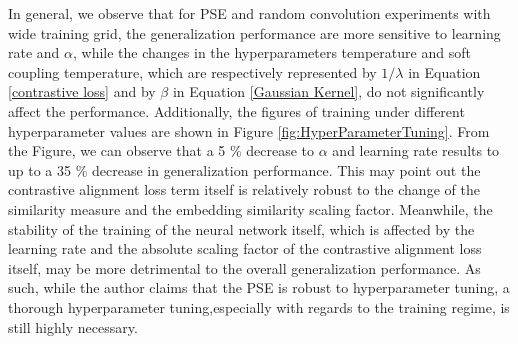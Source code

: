 \documentclass{usiinftr}
\begin{document}
In general, we observe that for PSE and random convolution experiments with wide training grid, the generalization performance are more sensitive to learning rate and $\alpha$, while the changes in the hyperparameters temperature and soft coupling temperature, which are respectively represented by $1 / \lambda $ in Equation \ref{contrastive loss} and by $\beta$ in Equation \ref{Gaussian Kernel}, do not significantly affect the performance. Additionally, the figures of training under different hyperparameter values are shown in Figure \ref{fig:HyperParameterTuning}. From the Figure, we can observe that a 5 \% decrease to $\alpha$ and learning rate results to up to a 35 \% decrease in generalization performance.  This may point out the contrastive alignment loss term itself is relatively robust to the change of the similarity measure and the embedding similarity scaling factor. Meanwhile, the stability of the training of the neural network itself, which is affected by the learning rate and the absolute scaling factor of the contrastive alignment loss itself, may be more detrimental to the overall generalization performance. As such, while the author claims that the PSE is robust to hyperparameter tuning, a thorough hyperparameter tuning,especially with regards to the training regime, is still highly necessary. 
\end{document}
